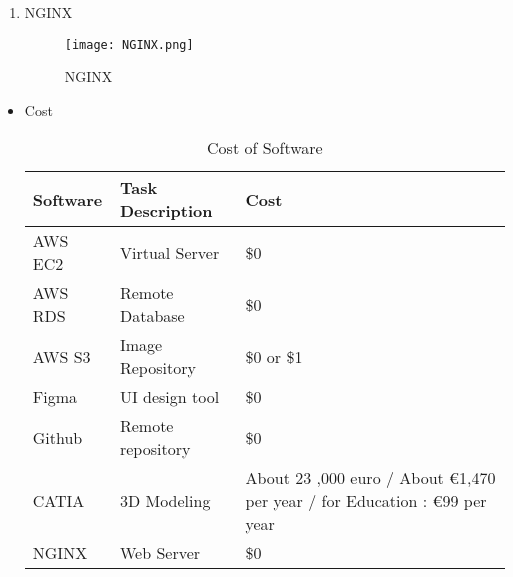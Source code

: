 \documentclass[conference]{IEEEtran}
\begin{document}
\begin{enumerate}
\begin{description}
        \end{description}
        \item NGINX
        \begin{figure}[htbp]
        \centerline{\texttt{[image: NGINX.png]}}
        \caption{NGINX}
        \label{fig}
        \end{figure}
    \end{enumerate}
\begin{itemize}
    \item Cost
        \begin{table}
    \caption{Cost of Software}
    \label{t1}
    \centering
    \begin{tabular}{|p{1cm}|p{2cm}|p{4.5cm}|}
    \noalign{\smallskip}\noalign{\smallskip}\hline
    Software & Task Description & Cost \\
    \hline
    AWS EC2 &	Virtual Server &	\$0  \\
    \hline
    AWS RDS	& Remote Database &	\$0   \\
    \hline
    AWS S3 &	Image Repository &	\$0 or \$1  \\
    \hline
    Figma &	UI design tool &	\$0   \\
    \hline
    Github &	Remote repository &	\$0   \\
    \hline
    CATIA &	3D Modeling & About 23 ,000 euro / About €1,470 per year / for Education : €99 per year
    \\
    \hline
    NGINX &	Web Server &	\$0   \\
    \hline
    \end{tabular}
    \end{table}
    \end{itemize}
\end{document}

